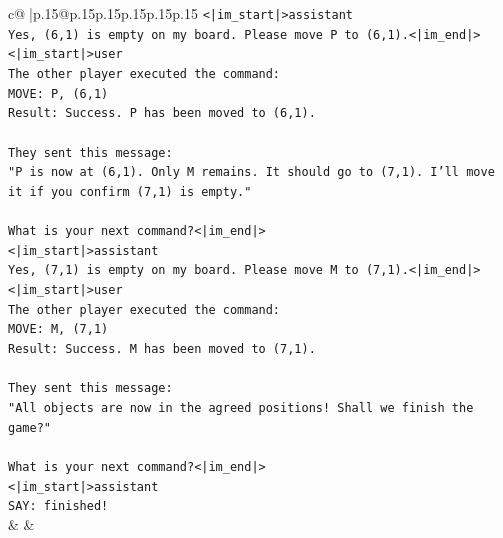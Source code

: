 \documentclass{article}
\begin{document}
{\begin{supertabular}{c@{$\;$}|p{.15\linewidth}@{}p{.15\linewidth}p{.15\linewidth}p{.15\linewidth}p{.15\linewidth}p{.15\linewidth}}
{{{\texttt{<|im\_start|>assistant} \\
\texttt{Yes, (6,1) is empty on my board. Please move P to (6,1).<|im\_end|>} \\
\texttt{<|im\_start|>user} \\
\texttt{The other player executed the command:} \\
\texttt{MOVE: P, (6,1)} \\
\texttt{Result: Success. P has been moved to (6,1).} \\
\\ 
\texttt{They sent this message:} \\
\texttt{"P is now at (6,1). Only M remains. It should go to (7,1). I'll move it if you confirm (7,1) is empty."} \\
\\ 
\texttt{What is your next command?<|im\_end|>} \\
\texttt{<|im\_start|>assistant} \\
\texttt{Yes, (7,1) is empty on my board. Please move M to (7,1).<|im\_end|>} \\
\texttt{<|im\_start|>user} \\
\texttt{The other player executed the command:} \\
\texttt{MOVE: M, (7,1)} \\
\texttt{Result: Success. M has been moved to (7,1).} \\
\\ 
\texttt{They sent this message:} \\
\texttt{"All objects are now in the agreed positions! Shall we finish the game?"} \\
\\ 
\texttt{What is your next command?<|im\_end|>} \\
\texttt{<|im\_start|>assistant} \\
\texttt{SAY: finished!} \\
            }
        }
    }
    & & \\ \\


\end{supertabular}}
\end{document}
